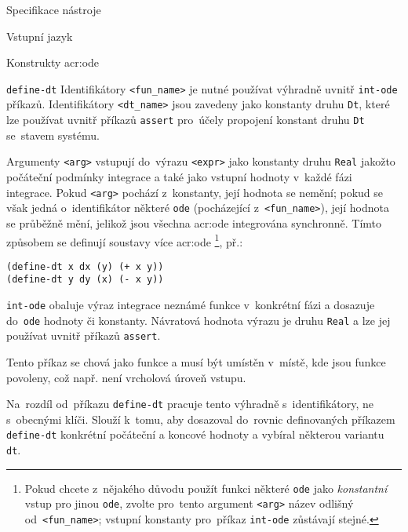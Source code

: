 \documentclass[thesis=M,czech]{FITthesis}[2012/06/26]
\newcommand{\acrlabel}[1]{acr:#1}
\newcommand{\acr}[1]{\acrshort{\acrlabel{#1}}}
\newcommand{\id}[1]{\texttt{#1}}
\newcommand{\hl}[1]{\textit{#1}}
\begin{document}
\begin{section}{Specifikace nástroje}
\begin{subsection}{Vstupní jazyk}
\begin{subsubsection}{Konstrukty \acr{ode}}
\begin{paragraph}{\id{define-dt}}
Identifikátory \id{<fun\_\-name>}
je nutné používat výhradně uvnitř \id{int\--ode} příkazů.
Identifikátory \id{<dt\_\-name>} jsou zavedeny jako konstanty druhu \id{Dt},
které lze používat uvnitř příkazů \id{assert}
pro~účely propojení konstant druhu \id{Dt} se~stavem systému.

Argumenty \id{<arg>} vstupují do~výrazu \id{<expr>}
jako konstanty druhu \id{Real} jakožto počáteční podmínky integrace
a také jako vstupní hodnoty v~každé fázi integrace.
Pokud \id{<arg>} pochází z~konstanty, její hodnota se nemění;
pokud se však jedná o~identifikátor některé \id{ode}
(pocházející z~\id{<fun\_\-name>}),
její hodnota se průběžně mění,
jelikož jsou všechna \acr{ode} integrována synchronně.
Tímto způsobem se definují soustavy více \acr{ode}%
\footnote{Pokud chcete z~nějakého důvodu
použít funkci některé \id{ode}
jako \hl{konstantní} vstup pro jinou \id{ode},
zvolte pro~tento argument \id{<arg>}
název odlišný od~\id{<fun\_\-name>};
vstupní konstanty pro~příkaz \id{int\--ode} zůstávají stejné.}, př.:
\begin{center}
\id{(define-dt x dx (y) (+ x y))}\\
\id{(define-dt y dy (x) (- x y))}
\end{center}
\end{paragraph} %


\begin{paragraph}{\id{int-ode}}\label{p:design:spec:ilang:ode:int}
obaluje výraz integrace neznámé funkce v~konkrétní fázi
a dosazuje do~\id{ode} hodnoty či konstanty.
Návratová hodnota výrazu je druhu \id{Real} a lze jej používat
uvnitř příkazů \id{assert}.

Tento příkaz se chová jako funkce a musí být umístěn v~místě,
kde jsou funkce povoleny,
což např. není vrcholová úroveň vstupu.

Na~rozdíl od~příkazu \id{define\--dt} pracuje tento
výhradně s~identifikátory, ne s~obecnými klíči.
Slouží k~tomu, aby dosazoval do~rovnic definovaných
příkazem \id{define\--dt} konkrétní
počáteční a koncové hodnoty
a vybíral některou variantu \id{dt}.


\end{paragraph}
\end{subsubsection}
\end{subsection}
\end{section}
\end{document}
